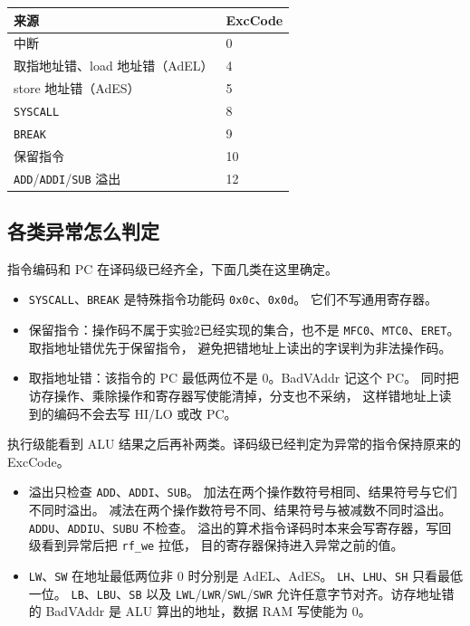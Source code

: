 \documentclass{article}
\begin{document}
\begin{center}
\begin{tabular}{ll}
\toprule
来源 & ExcCode \\
\midrule
中断 & 0 \\
取指地址错、load 地址错（AdEL） & 4 \\
store 地址错（AdES） & 5 \\
\texttt{SYSCALL} & 8 \\
\texttt{BREAK} & 9 \\
保留指令 & 10 \\
\texttt{ADD}/\texttt{ADDI}/\texttt{SUB} 溢出 & 12 \\
\bottomrule
\end{tabular}
\end{center}

\subsection{各类异常怎么判定}
指令编码和 PC 在译码级已经齐全，下面几类在这里确定。

\begin{itemize}
  \item \texttt{SYSCALL}、\texttt{BREAK} 是特殊指令功能码 \texttt{0x0c}、\texttt{0x0d}。
        它们不写通用寄存器。
  \item 保留指令：操作码不属于实验2已经实现的集合，也不是
        \texttt{MFC0}、\texttt{MTC0}、\texttt{ERET}。取指地址错优先于保留指令，
        避免把错地址上读出的字误判为非法操作码。
  \item 取指地址错：该指令的 PC 最低两位不是 0。BadVAddr 记这个 PC。
        同时把访存操作、乘除操作和寄存器写使能清掉，分支也不采纳，
        这样错地址上读到的编码不会去写 HI/LO 或改 PC。
\end{itemize}

执行级能看到 ALU 结果之后再补两类。译码级已经判定为异常的指令保持原来的 ExcCode。

\begin{itemize}
  \item 溢出只检查 \texttt{ADD}、\texttt{ADDI}、\texttt{SUB}。
        加法在两个操作数符号相同、结果符号与它们不同时溢出。
        减法在两个操作数符号不同、结果符号与被减数不同时溢出。
        \texttt{ADDU}、\texttt{ADDIU}、\texttt{SUBU} 不检查。
        溢出的算术指令译码时本来会写寄存器，写回级看到异常后把 \texttt{rf\_we} 拉低，
        目的寄存器保持进入异常之前的值。
  \item \texttt{LW}、\texttt{SW} 在地址最低两位非 0 时分别是 AdEL、AdES。
        \texttt{LH}、\texttt{LHU}、\texttt{SH} 只看最低一位。
        \texttt{LB}、\texttt{LBU}、\texttt{SB} 以及 \texttt{LWL}/\texttt{LWR}/\texttt{SWL}/\texttt{SWR}
        允许任意字节对齐。访存地址错的 BadVAddr 是 ALU 算出的地址，数据 RAM 写使能为 0。
\end{itemize}
\end{document}
